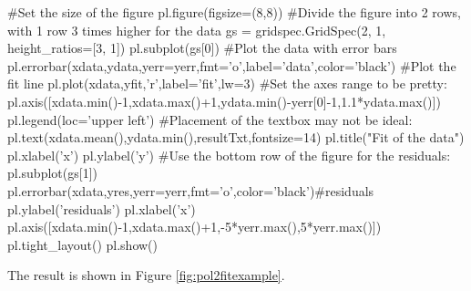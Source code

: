 \begin{python}[caption = \mbox{}]
#Set the size of the figure
pl.figure(figsize=(8,8))
#Divide the figure into 2 rows, with 1 row 3 times higher for the data
gs = gridspec.GridSpec(2, 1, height_ratios=[3, 1])
pl.subplot(gs[0])
#Plot the data with error bars
pl.errorbar(xdata,ydata,yerr=yerr,fmt='o',label='data',color='black')
#Plot the fit line
pl.plot(xdata,yfit,'r',label='fit',lw=3)
#Set the axes range to be pretty:
pl.axis([xdata.min()-1,xdata.max()+1,ydata.min()-yerr[0]-1,1.1*ydata.max()])
pl.legend(loc='upper left')
#Placement of the textbox may not be ideal:
pl.text(xdata.mean(),ydata.min(),resultTxt,fontsize=14)
pl.title("Fit of the data")
pl.xlabel('x')
pl.ylabel('y')
#Use the bottom row of the figure for the residuals:
pl.subplot(gs[1])
pl.errorbar(xdata,yres,yerr=yerr,fmt='o',color='black')#residuals
pl.ylabel('residuals')
pl.xlabel('x')
pl.axis([xdata.min()-1,xdata.max()+1,-5*yerr.max(),5*yerr.max()])
pl.tight_layout()
pl.show()
\end{python}
The result is shown in Figure \ref{fig:pol2fitexample}.

 